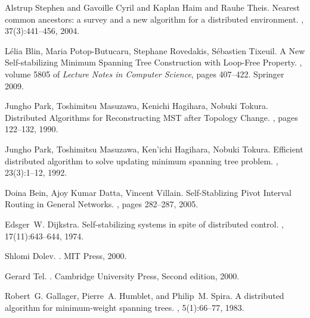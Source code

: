 \documentclass[11pt,a4paper]{article}
\begin{document}
\begin{thebibliography}{10}



Alstrup Stephen and Gavoille Cyril and Kaplan Haim and Rauhe Theis.
\newblock Nearest common ancestors: a survey and a new algorithm for a distributed environment.
, 37(3):441--456, 2004.







L{\'e}lia Blin, Maria Potop-Butucaru, Stephane Rovedakis, S{\'e}bastien Tixeuil.
\newblock  A New Self-stabilizing Minimum Spanning Tree Construction with Loop-Free Property.
, volume 5805 of {\em Lecture Notes in Computer Science}, pages 407--422. Springer 2009.

Jungho Park, Toshimitsu Masuzawa, Kenichi Hagihara, Nobuki Tokura.
\newblock Distributed Algorithms for Reconstructing MST after Topology Change.
, pages 122--132, 1990.

Jungho Park, Toshimitsu Masuzawa, Ken'ichi Hagihara, Nobuki Tokura.
\newblock Efficient distributed algorithm to solve updating minimum spanning tree problem.
, 23(3):1--12, 1992.

Doina Bein, Ajoy Kumar Datta, Vincent Villain.
\newblock Self-Stablizing Pivot Interval Routing in General Networks.
, pages 282--287, 2005.



Edsger~W. Dijkstra.
\newblock Self-stabilizing systems in spite of distributed control.
, 17(11):643--644, 1974.


Shlomi Dolev.
.
\newblock MIT Press, 2000.

Gerard Tel.
.
\newblock Cambridge University Press, Second edition, 2000.







Robert~G. Gallager, Pierre~A. Humblet, and Philip~M. Spira.
\newblock A distributed algorithm for minimum-weight spanning trees.
, 5(1):66--77, 1983.








\end{thebibliography}
\end{document}
